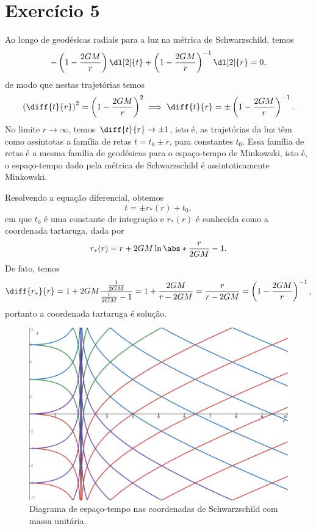 \section*{Exercício 5}
Ao longo de geodésicas radiais para a luz na métrica de Schwarzschild, temos
\begin{equation*}
    -\left(1 - \frac{2GM}{r}\right)\dl[2]{t} + \left(1 - \frac{2GM}{r}\right)^{-1}\dl[2]{r} = 0,
\end{equation*}
de modo que nestas trajetórias temos
\begin{equation*}
    \left(\diff{t}{r}\right)^2 = \left(1 - \frac{2GM}{r}\right)^2 \implies \diff{t}{r} = \pm \left(1 - \frac{2GM}{r}\right)^{-1}.
\end{equation*}
No limite \(r \to \infty\), temos \(\diff{t}{r} \to \pm 1\), isto é, as trajetórias da luz têm como assíntotas a família de retas \(t = t_0 \pm r\), para constantes \(t_0\). Essa família de retas é a mesma família de geodésicas para o espaço-tempo de Minkowski, isto é, o espaço-tempo dado pela métrica de Schwarzschild é assintoticamente Minkowski.

Resolvendo a equação diferencial, obtemos
\begin{equation*}
    t = \pm r_*(r) + t_0,
\end{equation*}
em que \(t_0\) é uma constante de integração e \(r_*(r)\) é conhecida como a coordenada tartaruga, dada por
\begin{equation*}
    r_*(r) = r + 2GM \ln\abs*{\frac{r}{2GM}-1}.
\end{equation*}
De fato, temos
\begin{equation*}
    \diff{r_*}{r} = 1 + 2GM\frac{\frac1{2GM}}{\frac{r}{2GM}-1} = 1 + \frac{2GM}{r - 2GM} = \frac{r}{r - 2GM} = \left(1 - \frac{2GM}{r}\right)^{-1},
\end{equation*}
portanto a coordenada tartaruga é solução.

\begin{figure}[ht]
    \centering
    \includegraphics[width=0.6\linewidth]{schwarzschild.png}
    \caption{Diagrama de espaço-tempo nas coordenadas de Schwarzschild com massa unitária.}
    \label{fig:schwarzschild}
\end{figure}

